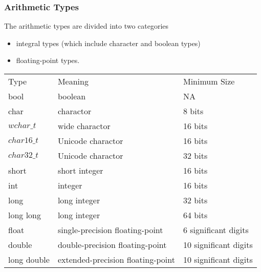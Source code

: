 \documentclass[11pt]{article}
\begin{document}
\subsubsection{Arithmetic Types}
\label{sec-2-1-1}
The arithmetic types are divided into two categories
\begin{itemize}
\item integral types (which include character and boolean types)
\item floating-point types.
\end{itemize}
\hline
\begin{center}
\begin{tabular}{lll}
Type & Meaning & Minimum Size\\
bool & boolean & NA\\
char & charactor & 8 bits\\
$wchar\_t$ & wide charactor & 16 bits\\
$char16\_t$ & Unicode charactor & 16 bits\\
$char32\_t$ & Unicode charactor & 32 bits\\
short & short integer & 16 bits\\
int & integer & 16 bits\\
long & long integer & 32 bits\\
long long & long integer & 64 bits\\
float & single-precision floating-point & 6 significant digits\\
double & double-precision floating-point & 10 significant digits\\
long double & extended-precision floating-point & 10 significant digits\\
\end{tabular}
\end{center}
\end{document}
